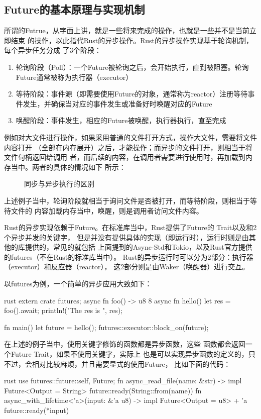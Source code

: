 \subsection{Future的基本原理与实现机制}
所谓的Futrue，从字面上讲，就是一些将来完成的操作，也就是一些并不是当前立即结束
的操作，以此指代Rust的异步操作。Rust的异步操作实现基于轮询机制，每个异步任务分成
了3个阶段：
\begin{enumerate}
  \item 轮询阶段（Poll）：一个Future被轮询之后，会开始执行，直到被阻塞。轮询Future通常被称为执行器（executor）
  \item 等待阶段：事件源（即需要使用Future的对象，通常称为reactor）注册等待事件发生，并确保当对应的事件发生或准备好时唤醒对应的Future
  \item 唤醒阶段：事件发生，相应的Future被唤醒，执行器执行，直至完成
\end{enumerate}

例如对大文件进行操作，如果采用普通的文件打开方式，操作大文件，需要将文件内容打开
（全部在内存展开）之后，才能操作；而异步的文件打开，则相当于将文件句柄返回给调用
者，而后续的内容，在调用者需要进行使用时，再加载到内存当中。两者的具体的情况如下
所示：
\begin{figure}[H]
  \centering
  
  \caption{同步与异步执行的区别\protect\footnotemark}
  \label{fig:rust_async}
\end{figure}
上述例子当中，轮询阶段就相当于询问文件是否被打开，而等待阶段，则相当于等待文件的
内容加载内存当中，唤醒，则是调用者访问文件内容。

Rust的异步实现依赖于Future。在标准库当中，Rust提供了Future的
Trait以及和2个异步并发的关键字，
但是并没有提供具体的实现（即运行时），运行时则是由其他的库提供的，常见的就包括
上面提到的Async-Std和Tokio，以及Rust官方提供的futures（不在Rust的标准库当中）。
Rust的异步运行时可以分为2部分：执行器（executor）和反应器（reactor），
这2部分则是由Waker（唤醒器）进行交互。

以futures为例，一个简单的异步应用大致如下：
\begin{code-block}{rust}
extern crate futures;
async fn foo() -> u8 { 8 }
async fn hello() {
    let res = foo().await;
    println!("The res is {}", res);
}

fn main() {
    let future = hello();
    futures::executor::block_on(future);
}
\end{code-block}
在上述的例子当中，使用关键字修饰的函数都是异步函数，这些
函数都会返回一个Future Trait，如果不使用关键字，实际上
也是可以实现异步函数的定义的，只不过，会相对比较麻烦，并且需要显式的使用Future，
比如下面的代码：
\begin{code-block}{rust}
use futures::future::{self, Future};
fn async_read_file(name: &str) -> impl Future<Output = String> {
    future::ready(String::from(name))
}
fn async_with_lifetime<'a>(input: &'a u8) -> impl Future<Output = u8> + 'a {
    future::ready(*input)
}
\end{code-block}

